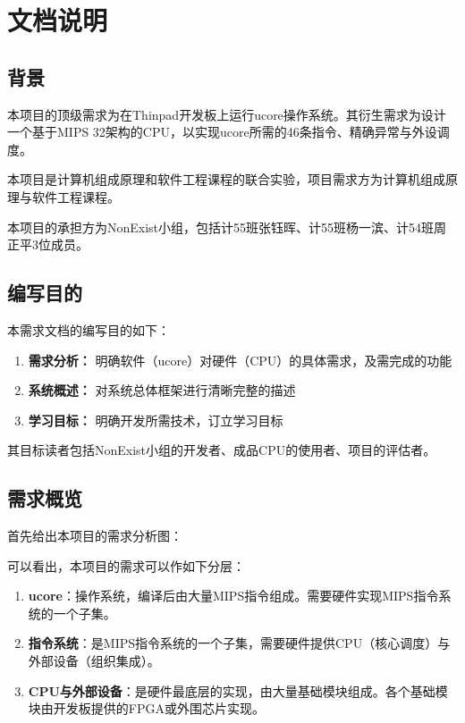 \chapter{文档说明}

\section{背景}

本项目的顶级需求为在Thinpad开发板上运行ucore操作系统。其衍生需求为设计一个基于MIPS 32架构的CPU，以实现ucore所需的46条指令、精确异常与外设调度。

本项目是计算机组成原理和软件工程课程的联合实验，项目需求方为计算机组成原理与软件工程课程。

本项目的承担方为NonExist小组，包括计55班张钰晖、计55班杨一滨、计54班周正平3位成员。

\section{编写目的}

本需求文档的编写目的如下：

\begin{enumerate}
    \item {\bf 需求分析：} 明确软件（ucore）对硬件（CPU）的具体需求，及需完成的功能
    \item {\bf 系统概述：} 对系统总体框架进行清晰完整的描述
    \item {\bf 学习目标：} 明确开发所需技术，订立学习目标
\end{enumerate}

其目标读者包括NonExist小组的开发者、成品CPU的使用者、项目的评估者。

\section{需求概览}

首先给出本项目的需求分析图：


可以看出，本项目的需求可以作如下分层：

\begin{enumerate}
    \item {\bf ucore}：操作系统，编译后由大量MIPS指令组成。需要硬件实现MIPS指令系统的一个子集。
    \item {\bf 指令系统}：是MIPS指令系统的一个子集，需要硬件提供CPU（核心调度）与外部设备（组织集成）。
    \item {\bf CPU与外部设备}：是硬件最底层的实现，由大量基础模块组成。各个基础模块由开发板提供的FPGA或外围芯片实现。
\end{enumerate}

